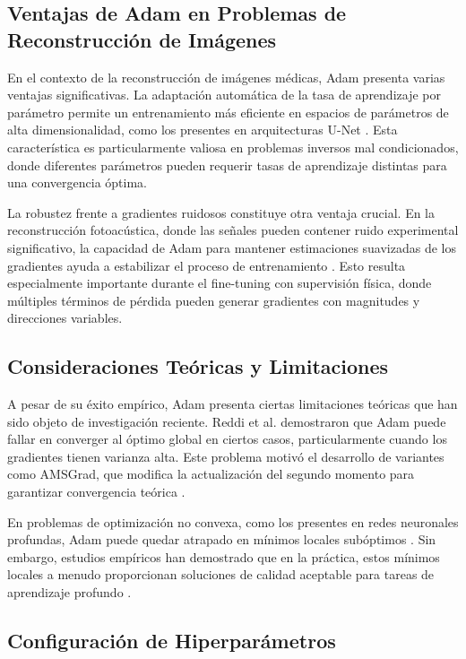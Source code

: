 \subsection{Ventajas de Adam en Problemas de Reconstrucción de Imágenes}

En el contexto de la reconstrucción de imágenes médicas, Adam presenta varias ventajas significativas. La adaptación automática de la tasa de aprendizaje por parámetro permite un entrenamiento más eficiente en espacios de parámetros de alta dimensionalidad, como los presentes en arquitecturas U-Net \cite{ruder2016overview}. Esta característica es particularmente valiosa en problemas inversos mal condicionados, donde diferentes parámetros pueden requerir tasas de aprendizaje distintas para una convergencia óptima.

La robustez frente a gradientes ruidosos constituye otra ventaja crucial. En la reconstrucción fotoacústica, donde las señales pueden contener ruido experimental significativo, la capacidad de Adam para mantener estimaciones suavizadas de los gradientes ayuda a estabilizar el proceso de entrenamiento \cite{reddi2019convergence}. Esto resulta especialmente importante durante el fine-tuning con supervisión física, donde múltiples términos de pérdida pueden generar gradientes con magnitudes y direcciones variables.

\subsection{Consideraciones Teóricas y Limitaciones}

A pesar de su éxito empírico, Adam presenta ciertas limitaciones teóricas que han sido objeto de investigación reciente. Reddi et al. \cite{reddi2019convergence} demostraron que Adam puede fallar en converger al óptimo global en ciertos casos, particularmente cuando los gradientes tienen varianza alta. Este problema motivó el desarrollo de variantes como AMSGrad, que modifica la actualización del segundo momento para garantizar convergencia teórica \cite{reddi2019convergence}.

En problemas de optimización no convexa, como los presentes en redes neuronales profundas, Adam puede quedar atrapado en mínimos locales subóptimos \cite{chen2018closing}. Sin embargo, estudios empíricos han demostrado que en la práctica, estos mínimos locales a menudo proporcionan soluciones de calidad aceptable para tareas de aprendizaje profundo \cite{li2018visualizing}.

\subsection{Configuración de Hiperparámetros}

